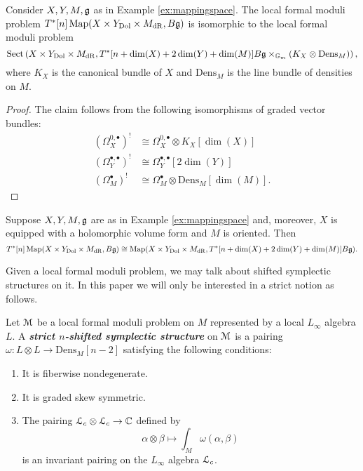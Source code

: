 \documentclass[10pt, oneside]{article}
\newcommand{\Dens}{\mathrm{Dens}}
\newcommand{\Gm}{\mathbb{G}_m}
\newcommand{\Sect}{\mathrm{Sect}}
\newcommand{\defterm}[1]{\textbf{\emph{#1}}}
\begin{document}
\begin{prop}
Consider $X,Y,M, \mathfrak g$ as in Example \ref{ex:mappingspace}. The local formal moduli problem $T^*[n]\operatorname{Map}(X\times Y_{\mathrm{Dol}}\times M_{\mathrm{dR}}, B\mathfrak g)$ is isomorphic to the local formal moduli problem
\[\Sect\left(X\times Y_{\mathrm{Dol}}\times M_{\mathrm{dR}}, T^*[n+\dim(X)+2\dim(Y)+\dim(M)] B\fg\times_{\Gm} (K_X\otimes \Dens_M)\right),\]
where $K_X$ is the canonical bundle of $X$ and $\Dens_M$ is the line bundle of densities on $M$.
\label{prop:mapintocotangent}
\end{prop}
\begin{proof}
The claim follows from the following isomorphisms of graded vector bundles:
\begin{align*}
\left(\Omega^{0, \bullet}_X\right)^!&\cong \Omega^{0, \bullet}_X\otimes K_X[\dim(X)] \\
\left(\Omega^{\bullet, \bullet}_Y\right)^!&\cong \Omega^{\bullet, \bullet}_Y[2\dim(Y)] \\
\left(\Omega^\bullet_M\right)^!&\cong \Omega^\bullet_M\otimes \Dens_M[\dim(M)].
\end{align*}
\end{proof}

\begin{cor}
Suppose $X,Y,M,\mathfrak g$ are as in Example \ref{ex:mappingspace} and, moreover, $X$ is equipped with a holomorphic volume form and $M$ is oriented. Then
\[T^*[n]\operatorname{Map}(X\times Y_{\mathrm{Dol}}\times M_{\mathrm{dR}}, B\mathfrak g)\cong \operatorname{Map}(X\times Y_{\mathrm{Dol}}\times M_{\mathrm{dR}}, T^*[n+\dim(X)+2\dim(Y)+\dim(M)] B\mathfrak g).\]
\label{cor:mapintocotangent}
\end{cor}

Given a local formal moduli problem, we may talk about shifted symplectic structures \cite{PTVV} on it. In this paper we will only be interested in a strict notion as follows.

\begin{definition}
Let $\mathcal M$ be a local formal moduli problem on $M$ represented by a local $L_\infty$ algebra $L$. A \defterm{strict $n$-shifted symplectic structure} on $\mathcal M$ is a pairing $\omega\colon L\otimes L\rightarrow \Dens_M[n-2]$ satisfying the following conditions:
\begin{enumerate}
\item It is fiberwise nondegenerate.

\item It is graded skew symmetric.

\item The pairing $\mathcal L_c\otimes \mathcal L_c \rightarrow \mathbb C$ defined by
\[\alpha\otimes \beta \mapsto \int_M \omega( \alpha, \beta)\]
is an invariant pairing on the $L_\infty$ algebra $\mathcal L_c$.
\end{enumerate}
\end{definition}
\end{document}
